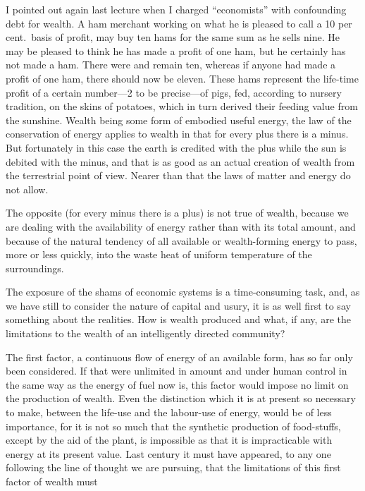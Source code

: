 \documentclass[10.5pt,twoside]{book}
\begin{document}
\noindent I pointed out again last lecture when I charged ``economists'' with
confounding debt for wealth. A ham merchant working on what he is pleased to
call a 10 per cent.\ basis of profit, may buy ten hams for the same sum as he
sells nine. He may be pleased to think he has made a profit of one ham, but he
certainly has not made a ham. There were and remain ten, whereas if anyone had
made a profit of one ham, there should now be eleven. These hams represent the
life-time profit of a certain number---2 to be precise---of pigs, fed,
according to nursery tradition, on the skins of potatoes, which in turn
derived their feeding value from the sunshine. Wealth being some form of
embodied useful energy, the law of the conservation of energy applies to
wealth in that for every plus there is a minus. But fortunately in this case
the earth is credited with the plus while the sun is debited with the minus,
and that is as good as an actual creation of wealth from the terrestrial point
of view. Nearer than that the laws of matter and energy do not allow.

The opposite (for every minus there is a plus) is not true of wealth, because
we are dealing with the availability of energy rather than with its total
amount, and because of the natural tendency of all available or wealth-forming
energy to pass, more or less quickly, into the waste heat of uniform
temperature of the surroundings.

The exposure of the shams of economic systems is a time-consuming task, and,
as we have still to consider the nature of capital and usury, it is as well
first to say something about the realities. How is wealth produced and what,
if any, are the limitations to the wealth of an intelligently directed
community?

The first factor, a continuous flow of energy of an available form, has so far
only been considered. If that were unlimited in amount and under human control
in the same way as the energy of fuel now is, this factor would impose no
limit on the production of wealth. Even the distinction which it is at present
so necessary to make, between the life-use and the labour-use of energy, would
be of less importance, for it is not so much that the synthetic production of
food-stuffs, except by the aid of the plant, is impossible as that it is
impracticable with energy at its present value. Last century it must have
appeared, to any one following the line of thought we are pursuing, that the
limitations of this first factor of wealth must
\end{document}
